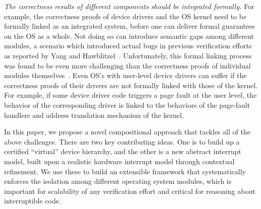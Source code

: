 %
{\em The correctness results of different components should be
integrated formally.} For example, the correctness proofs of device
drivers and the OS kernel
need to be formally linked as an integrated system,
before one can deliver formal guarantees on the OS as a whole. Not
doing so can introduce semantic gaps among different modules,
a scenario which introduced actual bugs in previous verification
efforts as reported by Yang and Hawblitzel~\cite{hawblitzel10}. Unfortunately,
this formal linking process was found to be even more challenging than
the correctness proofs of individual modules
themselves~\cite{Alkassar:VSTTE08-225}. Even OS's with user-level
device drivers can suffer if the correctness proofs of their drivers are not
formally linked with those of the kernel. For example,
if some device driver code triggers a page fault at the user level,
the behavior of the corresponding driver is linked to the behaviors of
the page-fault handlers and address translation mechanism of the kernel.

In this paper, we propose a novel compositional approach that tackles
all of the above challenges. There are two key contributing ideas.
One is to build up a certified ``virtual'' device hierarchy, and
the other is a new abstract interrupt model, built upon a realistic
hardware interrupt model through contextual refinement. We use these
to build an extensible framework that systematically enforces the
isolation among different operating system modules, which is important
for scalability of any verification effort and critical for reasoning
about interruptible code.


